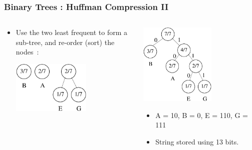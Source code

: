 \begin{frame}[fragile]
\frametitle{Binary Trees : Huffman Compression II}
\begin{columns}[T]

\begin{column}{0.45\textwidth}
\begin{itemize}[<+->]
\item Use the two least frequent to form a sub-tree, and re-order (sort) the nodes~:

\pause
\vspace*{2ex}
\begin{center}
\includegraphics[width=0.6\textwidth]{../Images/huff2.pdf}
\end{center}
\end{itemize}
\end{column}

\pause
\begin{column}{0.45\textwidth}
\begin{center}
\includegraphics[width=0.6\textwidth]{../Images/huff3.pdf}
\end{center}
\pause
\begin{itemize}[<+->]
\item A = 10, B = 0, E = 110, G = 111
\item String stored using 13 bits.
\end{itemize}
\end{column}

\end{columns}
\end{frame}
